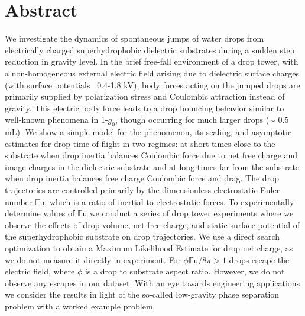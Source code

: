 \documentclass[12pt,a4paper,oneside]{book}
\begin{document}
\section*{Abstract}
\noindent
We investigate the dynamics of spontaneous jumps of water drops from electrically charged superhydrophobic dielectric substrates during a sudden step reduction in gravity level. In the brief free-fall environment of a drop tower, with a non-homogeneous external electric field arising due to dielectric surface charges (with surface potentials ~0.4-1.8 kV), body forces acting on the jumped drops are primarily supplied by polarization stress and Coulombic attraction instead of gravity. This electric body force leads to a drop bouncing behavior similar to well-known phenomena in 1-$g_0$, though occurring for much larger drops ($\sim$ 0.5 mL). We show a simple model for the phenomenon, its scaling, and asymptotic estimates for drop time of flight in two regimes: at short-times close to the substrate when drop inertia balances Coulombic force due to net free charge and image charges in the dielectric substrate and at long-times far from the substrate when drop inertia balances free charge Coulombic force and drag. The drop trajectories are controlled primarily by the dimensionless electrostatic Euler number $\mathbb{E}\mbox{u}$, which is a ratio of inertial to electrostatic forces. To experimentally determine values of $\mathbb{E}\mbox{u}$ we conduct a series of drop tower experiments where we observe the effects of drop volume, net free charge, and static surface potential of the superhydrophobic substrate on drop trajectories. We use a direct search optimization to obtain a Maximum Likelihood Estimate for drop net charge, as we do not measure it directly in experiment. For $\phi \mathbb{E}\mbox{u} /8 \pi > 1$ drops escape the electric field, where $\phi$ is a drop to substrate aspect ratio. However, we do not observe any escapes in our dataset. With an eye towards engineering applications we consider the results in light of the so-called low-gravity phase separation problem with a worked example problem.

\clearpage

\vspace*{\fill}
\end{document}
